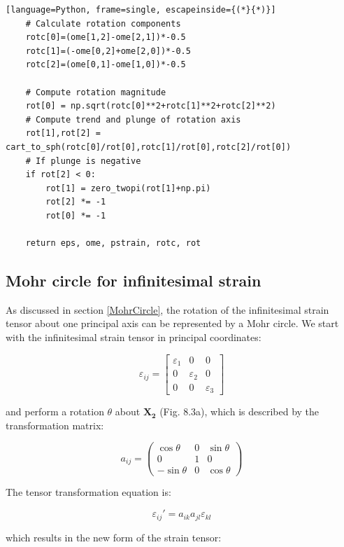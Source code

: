 \documentclass[a4paper , 12pt]{book}
\begin{document}
\begin{center}
\begin{lstlisting}[language=Python, frame=single, escapeinside={(*}{*)}]
	# Calculate rotation components
	rotc[0]=(ome[1,2]-ome[2,1])*-0.5
	rotc[1]=(-ome[0,2]+ome[2,0])*-0.5
	rotc[2]=(ome[0,1]-ome[1,0])*-0.5
	
	# Compute rotation magnitude
	rot[0] = np.sqrt(rotc[0]**2+rotc[1]**2+rotc[2]**2)
	# Compute trend and plunge of rotation axis
	rot[1],rot[2] = cart_to_sph(rotc[0]/rot[0],rotc[1]/rot[0],rotc[2]/rot[0])
	# If plunge is negative
	if rot[2] < 0:
		rot[1] = zero_twopi(rot[1]+np.pi)
		rot[2] *= -1
		rot[0] *= -1
	
	return eps, ome, pstrain, rotc, rot
\end{lstlisting}
\end{center}

\subsection{Mohr circle for infinitesimal strain}

As discussed in section \ref{MohrCircle}, the rotation of the infinitesimal strain tensor about one principal axis can be represented by a Mohr circle. We start with the infinitesimal strain tensor in principal coordinates:

\begin{equation*}
    \varepsilon_{ij}=\begin{bmatrix}\varepsilon_1&0&0\\ 0&\varepsilon_2&0\\ 0&0&\varepsilon_3\end{bmatrix}
\end{equation*}

and perform a rotation $\theta$ about $\mathbf{X_2}$ (Fig. 8.3a), which is described by the transformation matrix:

\begin{equation*}
    a_{ij} = \begin{pmatrix}\cos\theta&0&\sin\theta\\0&1&0\\-\sin\theta&0&\cos\theta\end{pmatrix}
\end{equation*}

The tensor transformation equation is:

\begin{equation}
    \varepsilon_{ij}' = a_{ik}a_{jl}\varepsilon_{kl}
\end{equation}

which results in the new form of the strain tensor:
\end{document}
